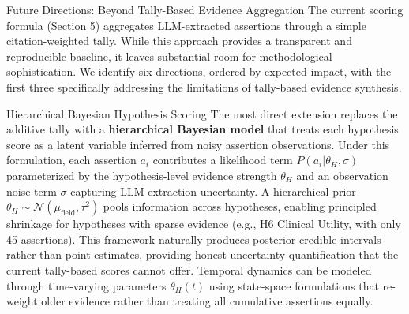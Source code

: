 \documentclass[
  ignorenonframetext,
]{beamer}
\begin{document}
\begin{frame}{Future Directions: Beyond Tally-Based Evidence
Aggregation}
\protect{}\label{future-directions-beyond-tally-based-evidence-aggregation}
The current scoring formula (Section 5) aggregates LLM-extracted
assertions through a simple citation-weighted tally. While this approach
provides a transparent and reproducible baseline, it leaves substantial
room for methodological sophistication. We identify six directions,
ordered by expected impact, with the first three specifically addressing
the limitations of tally-based evidence synthesis.

\begin{block}{Hierarchical Bayesian Hypothesis Scoring}
\protect{}\label{hierarchical-bayesian-hypothesis-scoring}
The most direct extension replaces the additive tally with a
\textbf{hierarchical Bayesian model} that treats each hypothesis score
as a latent variable inferred from noisy assertion observations. Under
this formulation, each assertion \(a_i\) contributes a likelihood term
\(P(a_i | \theta_H, \sigma)\) parameterized by the hypothesis-level
evidence strength \(\theta_H\) and an observation noise term \(\sigma\)
capturing LLM extraction uncertainty. A hierarchical prior
\(\theta_H \sim \mathcal{N}(\mu_{\text{field}}, \tau^2)\) pools
information across hypotheses, enabling principled shrinkage for
hypotheses with sparse evidence (e.g., H6 Clinical Utility, with only 45
assertions). This framework naturally produces posterior credible
intervals rather than point estimates, providing honest uncertainty
quantification that the current tally-based scores cannot offer.
Temporal dynamics can be modeled through time-varying parameters
\(\theta_H(t)\) using state-space formulations that re-weight older
evidence rather than treating all cumulative assertions equally.
\end{block}


\end{frame}
\end{document}
